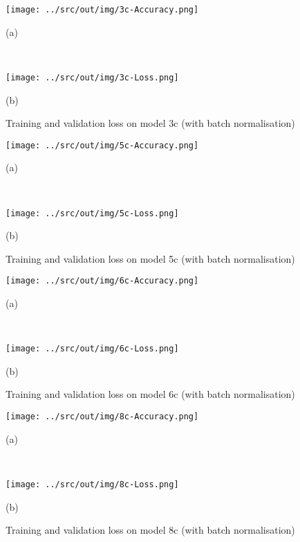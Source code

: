 \documentclass[a4paper,12pt]{article} %
\begin{document}
	\begin{figure}[H]
		\begin{minipage}[c]{.49\textwidth}
			\centering
			\texttt{[image: ../src/out/img/3c-Accuracy.png]}
			\caption*{(a)}
		\end{minipage}
		~
		\begin{minipage}[c]{.49\textwidth}
			\centering
			\texttt{[image: ../src/out/img/3c-Loss.png]}
			\caption*{(b)}
		\end{minipage}
		\caption{Training and validation loss on model 3c (with batch 
		normalisation)}
		\label{fig:model3c-performance}
	\end{figure}

	\begin{figure}[H]
		\begin{minipage}[c]{.49\textwidth}
			\centering
			\texttt{[image: ../src/out/img/5c-Accuracy.png]}
			\caption*{(a)}
		\end{minipage}
		~
		\begin{minipage}[c]{.49\textwidth}
			\centering
			\texttt{[image: ../src/out/img/5c-Loss.png]}
			\caption*{(b)}
		\end{minipage}
		\caption{Training and validation loss on model 5c (with batch 
			normalisation)}
		\label{fig:model5c-performance}
	\end{figure}


	\begin{figure}[H]
		\begin{minipage}[c]{.49\textwidth}
			\centering
			\texttt{[image: ../src/out/img/6c-Accuracy.png]}
			\caption*{(a)}
		\end{minipage}
		~
		\begin{minipage}[c]{.49\textwidth}
			\centering
			\texttt{[image: ../src/out/img/6c-Loss.png]}
			\caption*{(b)}
		\end{minipage}
		\caption{Training and validation loss on model 6c (with batch 
		normalisation)}
		\label{fig:model6c-performance}
	\end{figure}

	\begin{figure}[H]
		\begin{minipage}[c]{.49\textwidth}
			\centering
			\texttt{[image: ../src/out/img/8c-Accuracy.png]}
			\caption*{(a)}
		\end{minipage}
		~
		\begin{minipage}[c]{.49\textwidth}
			\centering
			\texttt{[image: ../src/out/img/8c-Loss.png]}
			\caption*{(b)}
		\end{minipage}
		\caption{Training and validation loss on model 8c (with batch 
		normalisation)}
		\label{fig:model8c-performance}
	\end{figure}
	
\end{document}
